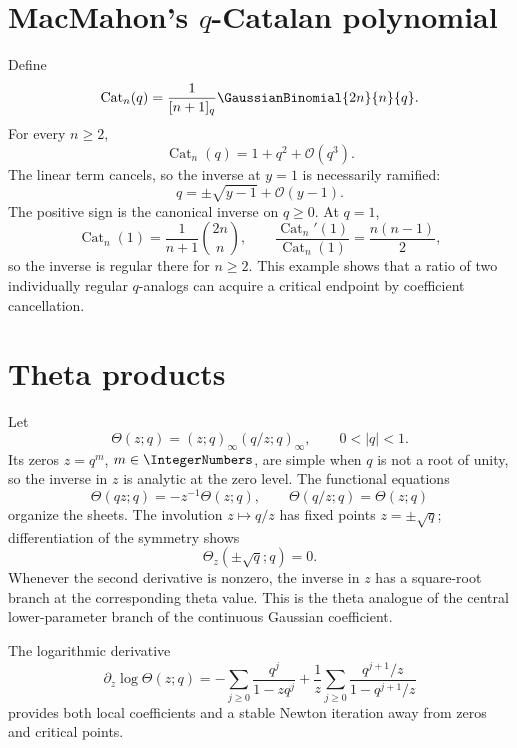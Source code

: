 \documentclass[11pt,oneside]{book}
\theoremstyle{definition}
\theoremstyle{remark}
\newcommand{\Cat}{\operatorname{Cat}}
\newcommand{\OO}{\mathcal{O}}
\begin{document}
\section{MacMahon's $q$-Catalan polynomial}
Define
\[
 \Cat_n(q)=\frac{1}{[n+1]_q}\GaussianBinomial{2n}{n}{q}.
\]
For every $n\ge2$,
\begin{equation}\label{eq:qCatalan-qzero}
 \Cat_n(q)=1+q^2+\OO(q^3).
\end{equation}
The linear term cancels, so the inverse at $y=1$ is necessarily ramified:
\begin{equation}\label{eq:qCatalan-inverse}
 q=\pm\sqrt{y-1}+\OO(y-1).
\end{equation}
The positive sign is the canonical inverse on $q\ge0$.  At $q=1$,
\[
 \Cat_n(1)=\frac1{n+1}\binom{2n}{n},
 \qquad
 \frac{\Cat_n'(1)}{\Cat_n(1)}=\frac{n(n-1)}2,
\]
so the inverse is regular there for $n\ge2$.  This example shows that a ratio
of two individually regular $q$-analogs can acquire a critical endpoint by
coefficient cancellation.

\section{Theta products}
Let
\begin{equation}\label{eq:theta-def}
 \Theta(z;q)=(z;q)_\infty(q/z;q)_\infty,
 \qquad 0<|q|<1.
\end{equation}
Its zeros $z=q^m$, $m\in\IntegerNumbers$, are simple when $q$ is not a root of unity, so
the inverse in $z$ is analytic at the zero level.  The functional equations
\[
 \Theta(qz;q)=-z^{-1}\Theta(z;q),
 \qquad
 \Theta(q/z;q)=\Theta(z;q)
\]
organize the sheets.  The involution $z\mapsto q/z$ has fixed points
$z=\pm\sqrt q$; differentiation of the symmetry shows
\[
 \Theta_z(\pm\sqrt q;q)=0.
\]
Whenever the second derivative is nonzero, the inverse in $z$ has a
square-root branch at the corresponding theta value.  This is the theta
analogue of the central lower-parameter branch of the continuous Gaussian
coefficient.

The logarithmic derivative
\[
 \partial_z\log\Theta(z;q)
 =-\sum_{j\ge0}\frac{q^j}{1-zq^j}
 +\frac1z\sum_{j\ge0}\frac{q^{j+1}/z}{1-q^{j+1}/z}
\]
provides both local coefficients and a stable Newton iteration away from
zeros and critical points.
\end{document}
